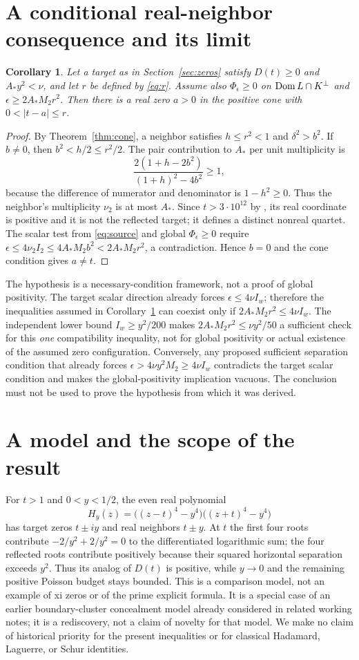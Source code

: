 \documentclass[11pt,a4paper]{article}
\newtheorem{corollary}[theorem]{Corollary}
\begin{document}
\section{A conditional real-neighbor consequence and its limit}
\begin{corollary}\label{cor:real}
Let a target as in Section~\ref{sec:zeros} satisfy $D(t)\ge0$ and $A_*y^2<\nu$, and let $r$ be defined by \eqref{eq:r}. Assume also $\Phi_\epsilon\ge0$ on $\operatorname{Dom} L\cap K^\perp$ and $\epsilon\ge2A_*M_2r^2$. Then there is a real zero $a>0$ in the positive cone with $0<|t-a|\le r$.
\end{corollary}
\begin{proof}
By Theorem~\ref{thm:cone}, a neighbor satisfies $h\le r^2<1$ and $\delta^2>b^2$. If $b\ne0$, then $b^2<h/2\le r^2/2$. The pair contribution to $A_*$ per unit multiplicity is
\[
 \frac{2(1+h-2b^2)}{(1+h)^2-4b^2}\ge1,
\]
because the difference of numerator and denominator is $1-h^2\ge0$. Thus the neighbor's multiplicity $\nu_2$ is at most $A_*$. Since $t>3\cdot10^{12}$ by \cite{Platt}, its real coordinate is positive and it is not the reflected target; it defines a distinct nonreal quartet. The scalar test from \eqref{eq:source} and global $\Phi_\epsilon\ge0$ require $\epsilon\le4\nu_2 I_2\le4A_*M_2b^2<2A_*M_2r^2$, a contradiction. Hence $b=0$ and the cone condition gives $a\ne t$.
\end{proof}
The hypothesis is a necessary-condition framework, not a proof of global positivity. The target scalar direction already forces $\epsilon\le4\nu I_w$; therefore the inequalities assumed in Corollary~\ref{cor:real} can coexist only if $2A_*M_2r^2\le4\nu I_w$. The independent lower bound $I_w\ge y^2/200$ makes $2A_*M_2r^2\le\nu y^2/50$ a sufficient check for this \emph{one} compatibility inequality, not for global positivity or actual existence of the assumed zero configuration. Conversely, any proposed sufficient separation condition that already forces $\epsilon>4\nu y^2M_2\ge4\nu I_w$ contradicts the target scalar condition and makes the global-positivity implication vacuous. The conclusion must not be used to prove the hypothesis from which it was derived.

\section{A model and the scope of the result}
For $t>1$ and $0<y<1/2$, the even real polynomial
\[
 H_y(z)=\big((z-t)^4-y^4\big)\big((z+t)^4-y^4\big)
\]
has target zeros $t\pm iy$ and real neighbors $t\pm y$. At $t$ the first four roots contribute $-2/y^2+2/y^2=0$ to the differentiated logarithmic sum; the four reflected roots contribute positively because their squared horizontal separation exceeds $y^2$. Thus its analog of $D(t)$ is positive, while $y\to0$ and the remaining positive Poisson budget stays bounded. This is a comparison model, not an example of xi zeros or of the prime explicit formula. It is a special case of an earlier boundary-cluster concealment model already considered in related working notes; it is a rediscovery, not a claim of novelty for that model. We make no claim of historical priority for the present inequalities or for classical Hadamard, Laguerre, or Schur identities.
\end{document}
